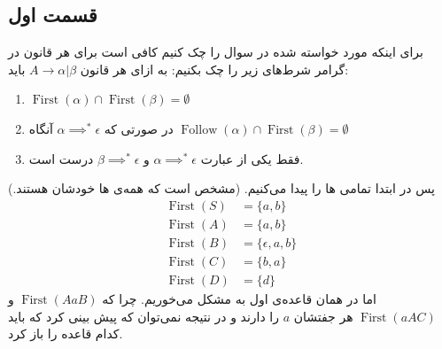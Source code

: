 \documentclass[]{article}
\begin{document}
\subsection*{قسمت اول}
برای اینکه مورد خواسته شده در سوال را چک کنیم کافی است برای هر قانون در گرامر شرط‌های زیر را چک
بکنیم: به ازای هر قانون
$A \rightarrow \alpha | \beta$
باید:
\begin{enumerate}
    \item $\operatorname{First}(\alpha) \cap \operatorname{First}(\beta) = \emptyset$
    \item در صورتی که $\alpha \implies^* \epsilon$ آنگاه  $\operatorname{Follow}(\alpha) \cap \operatorname{First}(\beta) = \emptyset$
    \item فقط یکی از عبارت $\alpha \implies^* \epsilon$ و $\beta \implies^* \epsilon$ درست است.
\end{enumerate}
پس در ابتدا
تمامی
ها
را پیدا می‌کنیم. (مشخص است که  همه‌ی ها خودشان هستند.)
\begin{align*}
    \operatorname{First}(S) &= \{a, b\}\\
    \operatorname{First}(A) &= \{a, b\}\\
    \operatorname{First}(B) &= \{\epsilon, a, b\}\\
    \operatorname{First}(C) &= \{b, a\}\\
    \operatorname{First}(D) &= \{d\}
\end{align*}
اما در همان قاعده‌ی اول به مشکل می‌خوریم. چرا که
$\operatorname{First}(AaB)$ و $\operatorname{First}(aAC)$
هر جفتشان
$a$
را دارند و در نتیجه نمی‌توان که پیش بینی کرد که باید کدام قاعده را باز کرد.
\end{document}

